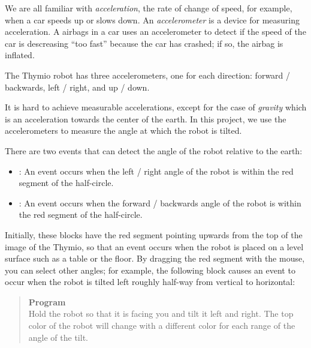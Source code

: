 
\label{ch.angles}

We are all familiar with \emph{acceleration}, the rate of change of
speed, for example, when a car speeds up or slows down. An
\emph{accelerometer} is a device for measuring acceleration. A airbags
in a car uses an accelerometer to detect if the speed of the car is
descreasing ``too fast'' because the car has crashed; if so, the airbag
is inflated.

The Thymio robot has three accelerometers, one for each direction:
forward / backwards, left / right, and up / down.


It is hard to achieve measurable accelerations, except for the case of
\emph{gravity} which is an acceleration towards the center of the earth.
In this project, we use the accelerometers to measure the angle at which
the robot is tilted.

There are two events that can detect the angle of the robot relative to
the earth: \label{p.accel}

\begin{itemize}

\item {}: An event occurs when the left / right
angle of the robot is within the red segment of the half-circle.

\item {}: An event occurs when the forward /
backwards angle of the robot is within the red segment of the
half-circle.

\end{itemize}

Initially, these blocks have the red segment pointing upwards from the
top of the image of the Thymio, so that an event occurs when the robot
is placed on a level surface such as a table or the floor. By dragging
the red segment with the mouse, you can select other angles; for
example, the following block causes an event to occur when the robot is
tilted left roughly half-way from vertical to horizontal:

\newpage

\begin{quote}
\textbf{Program}\\
Hold the robot so that it is facing you and tilt it left and right. The
top color of the robot will change with a different color for each range
of the angle of the tilt.
\end{quote}

